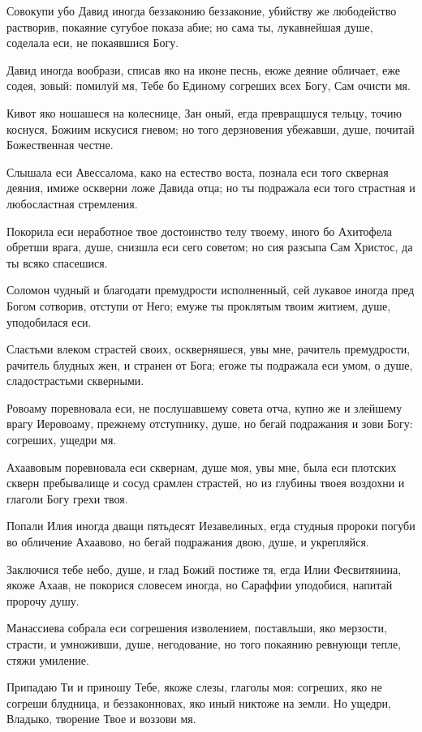 Совокупи убо Давид иногда беззаконию беззаконие, убийству же любодейство растворив, покаяние сугубое показа абие; но сама ты, лукавнейшая душе, соделала еси, не покаявшися Богу.

Давид иногда вообрази, списав яко на иконе песнь, еюже деяние обличает, еже содея, зовый: помилуй мя, Тебе бо Единому согреших всех Богу, Сам очисти мя.

Кивот яко ношашеся на колеснице, Зан оный, егда превращшуся тельцу, точию коснуся, Божиим искусися гневом; но того дерзновения убежавши, душе, почитай Божественная честне.

Слышала еси Авессалома, како на естество воста, познала еси того скверная деяния, имиже оскверни ложе Давида отца; но ты подражала еси того страстная и любосластная стремления.

Покорила еси неработное твое достоинство телу твоему, иного бо Ахитофела обретши врага, душе, снизшла еси сего советом; но сия разсыпа Сам Христос, да ты всяко спасешися.

Соломон чудный и благодати премудрости исполненный, сей лукавое иногда пред Богом сотворив, отступи от Него; емуже ты проклятым твоим житием, душе, уподобилася еси.

Сластьми влеком страстей своих, оскверняшеся, увы мне, рачитель премудрости, рачитель блудных жен, и странен от Бога; егоже ты подражала еси умом, о душе, сладострастьми скверными.

Ровоаму поревновала еси, не послушавшему совета отча, купно же и злейшему врагу Иеровоаму, прежнему отступнику, душе, но бегай подражания и зови Богу: согреших, ущедри мя.

Ахаавовым поревновала еси сквернам, душе моя, увы мне, была еси плотских скверн пребывалище и сосуд срамлен страстей, но из глубины твоея воздохни и глаголи Богу грехи твоя.

Попали Илия иногда дващи пятьдесят Иезавелиных, егда студныя пророки погуби во обличение Ахаавово, но бегай подражания двою, душе, и укрепляйся.

Заключися тебе небо, душе, и глад Божий постиже тя, егда Илии Фесвитянина, якоже Ахаав, не покорися словесем иногда, но Сараффии уподобися, напитай пророчу душу.

Манассиева собрала еси согрешения изволением, поставльши, яко мерзости, страсти, и умноживши, душе, негодование, но того покаянию ревнующи тепле, стяжи умиление.

Припадаю Ти и приношу Тебе, якоже слезы, глаголы моя: согреших, яко не согреши блудница, и беззаконновах, яко иный никтоже на земли. Но ущедри, Владыко, творение Твое и воззови мя.

